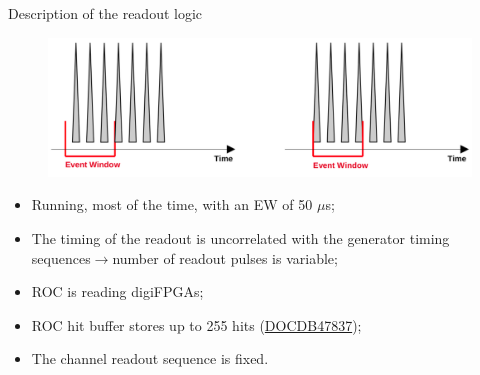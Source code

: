 \documentclass{beamer}[10pt]
\begin{document}
\begin{frame}{Description of the readout logic}
 \begin{figure}[H]
   \centering
   \includegraphics[width= 1.0\textwidth]{figures/png/Screenshot_20240308_165327.png}
   \label{fig:djn}
 \end{figure}
\begin{itemize}
\item Running, most of the time, with an EW of 50 $\mu$s;
\item The timing of the readout is uncorrelated with the generator timing sequences$\rightarrow$number of readout pulses is variable;
\item ROC is reading digiFPGAs;
\item ROC hit buffer stores up to 255 hits (\href{https://mu2e-docdb.fnal.gov/cgi-bin/sso/RetrieveFile?docid=47837&filename=mu2e-47837.pdf&version=1}{DOCDB47837});
\item The channel readout sequence is fixed.
\end{itemize}
\end{frame}
\end{document}

